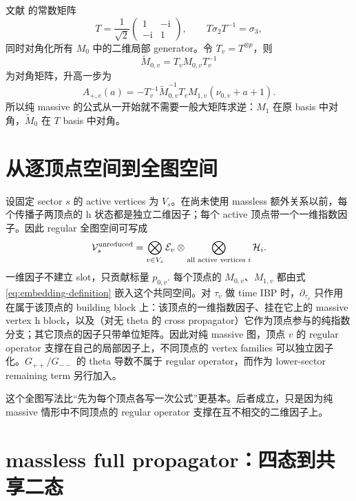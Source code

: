 \documentclass[11pt,a4paper]{ctexart}
\newcommand{\ii}{\mathrm i}
\newcommand{\cV}{\mathcal V}
\newcommand{\cE}{\mathcal E}
\newcommand{\cH}{\mathcal H}
\begin{document}
文献 \cite{Chen:2023eic} 的常数矩阵
\begin{equation}
 T=\frac1{\sqrt2}
 \begin{pmatrix}1&-\ii\\-\ii&1\end{pmatrix},
 \qquad
 T\sigma_2T^{-1}=\sigma_3,
 \label{eq:paper-T}
\end{equation}
同时对角化所有 $M_0$ 中的二维局部 generator。令 $T_v=T^{\otimes p}$，则
\begin{equation}
 \widetilde M_{0,v}=T_vM_{0,v}T_v^{-1}
\end{equation}
为对角矩阵，升高一步为
\begin{equation}
 A_{+,v}(a)
 =-T_v^{-1}\widetilde M_{0,v}^{-1}T_v
 M_{1,v}(\nu_{0,v}+a+1).
 \label{eq:Aplus-local}
\end{equation}
所以纯 massive 的公式从一开始就不需要一般大矩阵求逆：$M_1$ 在原 basis 中对角，$\widetilde M_0$ 在 $T$ basis 中对角。

\section{从逐顶点空间到全图空间}

设固定 sector $s$ 的 active vertices 为 $V_s$。在尚未使用 massless 额外关系以前，每个传播子两顶点的 h 状态都是独立二维因子；每个 active 顶点带一个一维指数因子。因此 regular 全图空间可写成
\begin{equation}
 \cV_s^{\rm unreduced}
 =\bigotimes_{v\in V_s}\cE_v
 \otimes
 \bigotimes_{\text{all active vertices }i}\cH_i.
 \label{eq:global-unreduced-space}
\end{equation}
一维因子不建立 slot，只贡献标量 $p_{0,v}$. 每个顶点的 $M_{0,v}$、$M_{1,v}$ 都由式 \eqref{eq:embedding-definition} 嵌入这个共同空间。对 $\tau_v$ 做 time IBP 时，$\partial_{\tau_v}$ 只作用在属于该顶点的 building block 上：该顶点的一维指数因子、挂在它上的 massive vertex h block，以及（对无 theta 的 cross propagator）它作为顶点参与的纯指数分支；其它顶点的因子只带单位矩阵。因此对纯 massive 图，顶点 $v$ 的 regular operator 支撑在自己的局部因子上，不同顶点的 vertex families 可以独立因子化。$G_{++}/G_{--}$ 的 theta 导数不属于 regular operator，而作为 lower-sector remaining term 另行加入。

这个全图写法比“先为每个顶点各写一次公式”更基本。后者成立，只是因为纯 massive 情形中不同顶点的 regular operator 支撑在互不相交的二维因子上。

\section{massless full propagator：四态到共享二态}
\label{sec:massless-full-edge}
\end{document}
